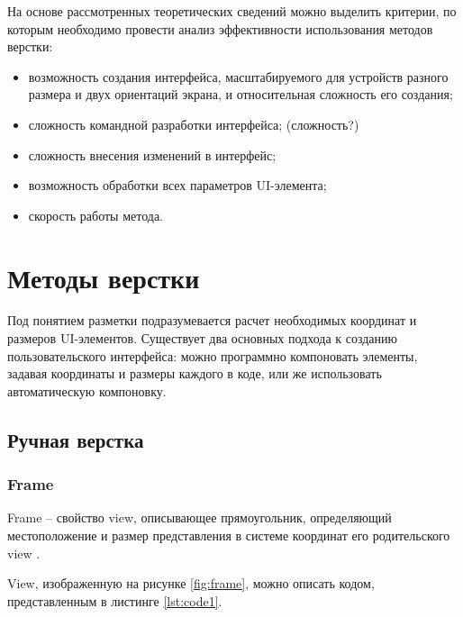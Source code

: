 На основе рассмотренных теоретических сведений можно выделить критерии, по которым необходимо провести анализ эффективности использования методов верстки:

\begin{itemize}[label=---]
	\item возможность создания интерфейса, масштабируемого для устройств разного размера и двух ориентаций экрана, и относительная сложность его создания;
	\item сложность командной разработки интерфейса; (сложность?)
	\item сложность внесения изменений в интерфейс;
	\item возможность обработки всех параметров UI-элемента;
	\item скорость работы метода.
\end{itemize}

\chapter{Методы верстки}

Под понятием разметки подразумевается расчет необходимых координат и размеров UI-элементов.
Существует два основных подхода к созданию пользовательского интерфейса: можно программно компоновать элементы, задавая координаты и размеры каждого в коде, или же использовать автоматическую компоновку.

\section{Ручная верстка}

\subsection{Frame}

Frame \cite{frame} -- свойство view, описывающее прямоугольник, определяющий местоположение и размер представления в системе координат его родительского view \cite{superview}.

View, изображенную на рисунке \ref{fig:frame}, можно описать кодом, представленным в листинге \ref{lst:code1}. 

